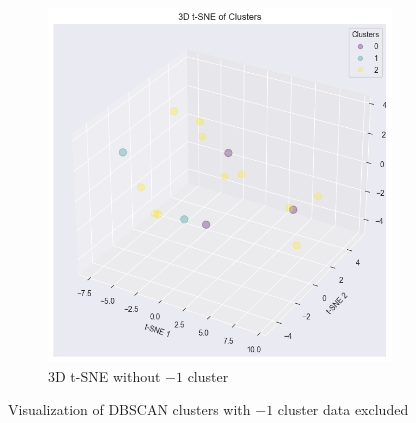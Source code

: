 \begin{figure}[H]
\begin{subfigure}[b]{0.45\textwidth}
        \includegraphics[width=1.0\textwidth]{src/figs/3d_t-SNE_DBSCAN_without.png} 
        \caption{3D t-SNE without $-1$ cluster}\label{fig:DBSCAN_tsne_without}
    \end{subfigure}
    \caption{Visualization of DBSCAN clusters with $-1$ cluster data excluded}\label{fig:without_outliers}
    \hspace*{\fill}
\end{figure}
